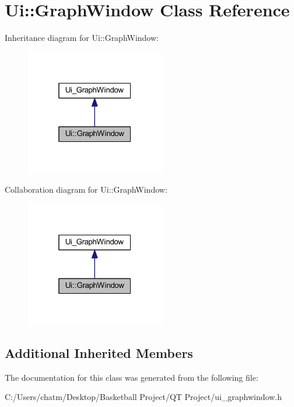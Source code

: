 \hypertarget{class_ui_1_1_graph_window}{}\section{Ui\+::Graph\+Window Class Reference}
\label{class_ui_1_1_graph_window}


Inheritance diagram for Ui\+::Graph\+Window\+:\nopagebreak
\begin{figure}[H]
\begin{center}
\leavevmode
\includegraphics[width=172pt]{class_ui_1_1_graph_window__inherit__graph}
\end{center}
\end{figure}


Collaboration diagram for Ui\+::Graph\+Window\+:\nopagebreak
\begin{figure}[H]
\begin{center}
\leavevmode
\includegraphics[width=172pt]{class_ui_1_1_graph_window__coll__graph}
\end{center}
\end{figure}
\subsection*{Additional Inherited Members}


The documentation for this class was generated from the following file\+:\begin{DoxyCompactItemize}
\item 
C\+:/\+Users/chatm/\+Desktop/\+Basketball Project/\+Q\+T Project/ui\+\_\+graphwindow.\+h\end{DoxyCompactItemize}
